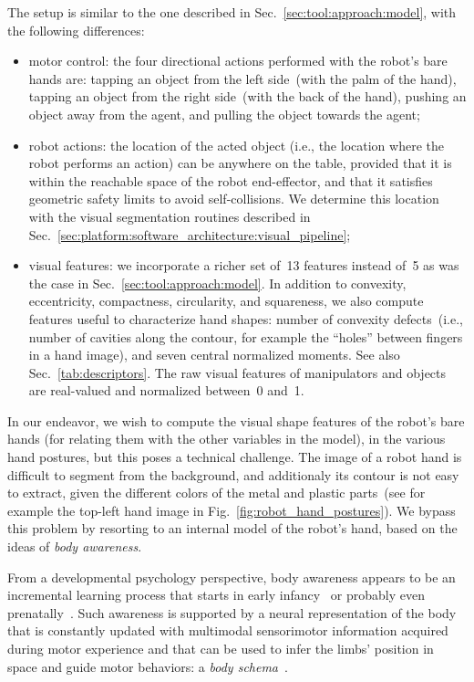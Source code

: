 The setup is similar to the one described in Sec.~\ref{sec:tool:approach:model}, with the following differences:
\begin{itemize}
  \item motor control: the four directional actions performed with the robot's bare hands are: tapping an object from the left side~(with the palm of the hand), tapping an object from the right side~(with the back of the hand), pushing an object away from the agent, and pulling the object towards the agent;

  \item robot actions: the location of the acted object (i.e., the location where the robot performs an action) can be anywhere on the table, provided that it is within the reachable space of the robot end-effector, and that it satisfies geometric safety limits to avoid self-collisions. We determine this location with the visual segmentation routines described in Sec.~\ref{sec:platform:software_architecture:visual_pipeline};

  \item visual features: we incorporate a richer set of~13 features instead of~5 as was the case in Sec.~\ref{sec:tool:approach:model}.
  In addition to convexity, eccentricity, compactness, circularity, and squareness, we also compute features useful to characterize hand shapes: number of convexity defects~(i.e., number of cavities along the contour, for example the ``holes'' between fingers in a hand image), and seven central normalized moments.
  See also Sec.~\ref{tab:descriptors}.
  The raw visual features of manipulators and objects are real-valued and normalized between~0 and~1.
\end{itemize}

In our endeavor, we wish to compute the visual shape features of the robot's bare hands (for relating them with the other variables in the model), in the various hand postures, but this poses a technical challenge.
The image of a robot hand is difficult to segment from the background, and additionaly its contour is not easy to extract, given the different colors of the metal and plastic parts~(see for example the top-left hand image in Fig.~\ref{fig:robot_hand_postures}).
We bypass this problem by resorting to an internal model of the robot's hand, based on the ideas of \emph{body awareness}.

From a developmental psychology perspective, body awareness appears to be an incremental learning process that starts in early infancy~\cite{vonhofsten:2004:tcs} or probably even prenatally~\cite{joseph:2000:drev}.
Such awareness is supported by a neural representation of the body that is constantly updated with multimodal sensorimotor information acquired during motor experience and that can be used to infer the limbs' position in space and guide motor behaviors: a \emph{body schema}~\cite{berlucchi:1997:tneu}.


